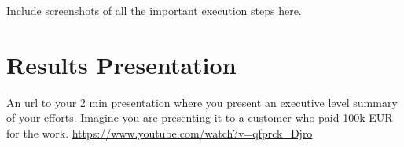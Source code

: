 Include screenshots of all the important execution steps here. 

\section{Results Presentation}\label{sec:presentation}

An url to your 2 min presentation where you present an executive level summary of your efforts. Imagine you are presenting it to a customer who paid 100k EUR for the work. \url{https://www.youtube.com/watch?v=qfprck_Djro} 